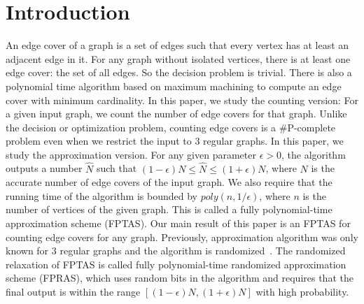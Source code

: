 \section{Introduction}
An edge cover of a graph is a set of edges such that every vertex has at least an adjacent edge in it.
 For any graph without isolated vertices, there is at least one edge cover: the set of all edges. So the decision problem is trivial. There is also a polynomial time algorithm based on maximum machining to compute an edge cover with minimum cardinality.     In this paper, we study the counting version:
 For a given input graph, we count the number of edge covers for that graph. Unlike the decision or optimization problem, counting edge covers is a \#P-complete problem even when we restrict the input to 3 regular graphs. In this paper, we study the approximation version. For any given parameter $\epsilon>0$, the algorithm outputs a number $\hat{N}$ such that $(1-\epsilon) N\leq \hat{N} \leq (1+\epsilon) N$, where $N$ is the accurate number of edge covers of the input graph. We also require that the running time of the algorithm is bounded by $poly(n,1/\epsilon)$, where $n$ is the number of vertices of the given graph. This is called a fully polynomial-time approximation scheme (FPTAS). Our main result of this paper is an FPTAS for counting edge covers for any graph. Previously, approximation algorithm was only known for 3 regular graphs and the algorithm is randomized~\cite{MFCS09}. The randomized relaxation of FPTAS is called fully polynomial-time randomized approximation scheme (FPRAS), which uses random bits in the algorithm and requires that the final output is within the range $[(1-\epsilon) N, (1+\epsilon) N]$ with high probability.

